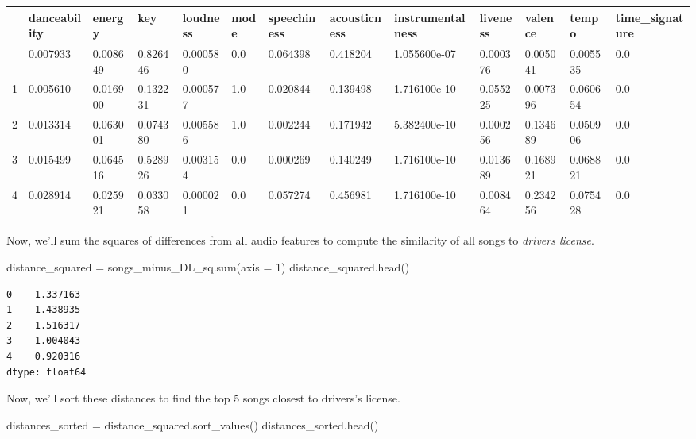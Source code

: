 \documentclass[
  letterpaper,
  DIV=11,
  numbers=noendperiod]{scrreprt}
\newenvironment{Shaded}{\begin{snugshade}}{\end{snugshade}}
\newcommand{\BuiltInTok}[1]{\textcolor[rgb]{0.00,0.23,0.31}{#1}}
\newcommand{\DecValTok}[1]{\textcolor[rgb]{0.68,0.00,0.00}{#1}}
\newcommand{\NormalTok}[1]{\textcolor[rgb]{0.00,0.23,0.31}{#1}}
\newcommand{\OperatorTok}[1]{\textcolor[rgb]{0.37,0.37,0.37}{#1}}
\begin{document}
\begin{longtable}[]{@{}lllllllllllll@{}}
\toprule\noalign{}
& danceability & energy & key & loudness & mode & speechiness &
acousticness & instrumentalness & liveness & valence & tempo &
time\_signature \\
\midrule\noalign{}
\endhead
\bottomrule\noalign{}
\endlastfoot
0 & 0.007933 & 0.008649 & 0.826446 & 0.000580 & 0.0 & 0.064398 &
0.418204 & 1.055600e-07 & 0.000376 & 0.005041 & 0.005535 & 0.0 \\
1 & 0.005610 & 0.016900 & 0.132231 & 0.000577 & 1.0 & 0.020844 &
0.139498 & 1.716100e-10 & 0.055225 & 0.007396 & 0.060654 & 0.0 \\
2 & 0.013314 & 0.063001 & 0.074380 & 0.005586 & 1.0 & 0.002244 &
0.171942 & 5.382400e-10 & 0.000256 & 0.134689 & 0.050906 & 0.0 \\
3 & 0.015499 & 0.064516 & 0.528926 & 0.003154 & 0.0 & 0.000269 &
0.140249 & 1.716100e-10 & 0.013689 & 0.168921 & 0.068821 & 0.0 \\
4 & 0.028914 & 0.025921 & 0.033058 & 0.000021 & 0.0 & 0.057274 &
0.456981 & 1.716100e-10 & 0.008464 & 0.234256 & 0.075428 & 0.0 \\
\end{longtable}

Now, we'll sum the squares of differences from all audio features to
compute the similarity of all songs to \emph{drivers license}.

\begin{Shaded}
\begin{Highlighting}[]
\NormalTok{distance\_squared }\OperatorTok{=}\NormalTok{ songs\_minus\_DL\_sq.}\BuiltInTok{sum}\NormalTok{(axis }\OperatorTok{=} \DecValTok{1}\NormalTok{)}
\NormalTok{distance\_squared.head()}
\end{Highlighting}
\end{Shaded}

\begin{verbatim}
0    1.337163
1    1.438935
2    1.516317
3    1.004043
4    0.920316
dtype: float64
\end{verbatim}

Now, we'll sort these distances to find the top 5 songs closest to
drivers's license.

\begin{Shaded}
\begin{Highlighting}[]
\NormalTok{distances\_sorted }\OperatorTok{=}\NormalTok{ distance\_squared.sort\_values()}
\NormalTok{distances\_sorted.head()}
\end{Highlighting}
\end{Shaded}
\end{document}
